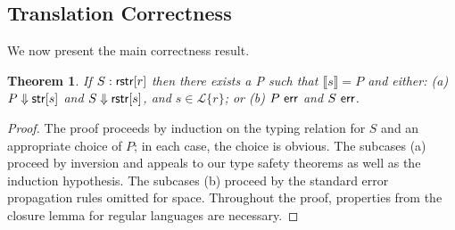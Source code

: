 \documentclass{acm_proc_article-sp}
\newtheorem{thm}{Theorem}
\theoremstyle{definition}
\newcommand{\Lagr}{\mathcal{L}}
\newcommand{\lang}[1]{\Lagr\{#1\}}
\newcommand{\sistr}[1]{{\sf rstr}[#1]}   \newcommand{\rstr}[1]{{\sf rstr}[#1]} %
\newcommand{\strin}[1]{\sistr{#1}}
\renewcommand{\tstr}[1]{{{\sf str}[#1]}}
\newcommand{\err}{\ {\sf err}}
\newcommand{\trden}[1]{\llbracket #1 \rrbracket} %
\newcommand{\treduces}{ \Downarrow }
\newcommand{\sreduces}{ \Downarrow }
\begin{document}
\subsection{Translation Correctness}

We now present the main correctness result.

\begin{thm}
If $S : \strin{r}$ then there exists a P such that $\trden{s} = P$ and either: 
(a) $P \treduces \tstr{s}$ and $S \sreduces \strin{s}$, and $s \in \lang{r}$; or
(b) $P \err$ and $S \err$.
\end{thm}

\begin{proof}
The proof proceeds by induction on the typing relation for $S$ and an appropriate
choice of $P$; in each case, the choice is obvious. The subcases (a) proceed
by inversion and appeals to our type safety theorems as well as the induction hypothesis. The subcases (b) proceed
by the standard error propagation rules omitted for space.
Throughout the proof, properties from the closure lemma for regular languages
are necessary.


\end{proof}
\end{document}
